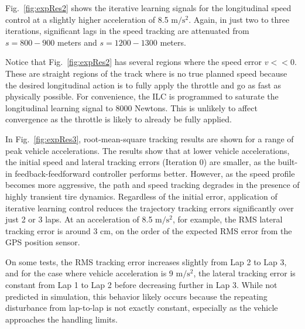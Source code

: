 \documentclass[9pt,shortpaper,twoside,web]{ieeecolor}
\begin{document}
Fig.~\ref{fig:expRes2} shows the iterative learning signals for the longitudinal speed control at a slightly
higher acceleration of 8.5 $\mathrm{m/s^2}$. Again, in just
two to three iterations, significant lags in the speed tracking are attenuated from $s = 800-900$ meters and $s = 1200-1300$ meters. 

 
 Notice that Fig.~\ref{fig:expRes2} has
several regions where the speed error $v << 0$. These are straight regions of the track where is no true planned speed
because the desired longitudinal action is to fully apply the throttle and go as fast as physically possible. For convenience, the ILC is programmed to saturate the longitudinal
learning signal to 8000 Newtons. This is unlikely to affect convergence as the throttle is likely to already be fully applied. 


In Fig.~\ref{fig:expRes3}, root-mean-square tracking results are shown for a range of peak vehicle accelerations. 
The results show that at lower vehicle accelerations,
the initial speed and lateral tracking errors (Iteration 0) are smaller, as the built-in feedback-feedforward controller 
performs better. However, as the speed profile becomes more aggressive, the path and speed tracking degrades in the presence
of highly transient tire dynamics. Regardless of the initial error, application of iterative learning control 
reduces the trajectory tracking errors significantly over just 2 or 3 laps. At an acceleration of 8.5 $\mathrm{m/s^2}$, for example, the RMS
lateral tracking error is around 3 cm, on the order of the expected RMS error from the GPS position sensor. 

On some tests, the RMS tracking error 
increases slightly from
Lap 2 to Lap 3, and for the case where vehicle acceleration is 9 $\mathrm{m/s^2}$, the lateral tracking error is constant from Lap 1 to Lap 2
before decreasing further in Lap 3. While not predicted in simulation, this behavior likely occurs because the repeating disturbance
from lap-to-lap is not exactly constant, especially as the vehicle approaches the handling limits. 
\end{document}
